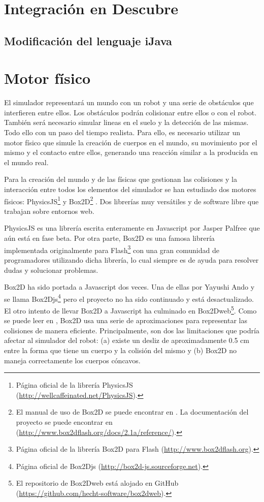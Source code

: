 \section{Integración en Descubre}
\label{sec:integracion-descubre}

\subsection{Modificación del lenguaje iJava}
\label{sec:modificacion-ijava}







\section{Motor físico}
\label{sec:motor-fisico}

El simulador representará un mundo con un robot y una serie de obstáculos que interfieren entre ellos. Los obstáculos podrán colisionar entre ellos o con el robot. También será necesario simular lineas en el suelo y la detección de las mismas. Todo ello con un paso del tiempo realista. Para ello, es necesario utilizar un motor físico que simule la creación de cuerpos en el mundo, su movimiento por el mismo y el contacto entre ellos, generando una reacción similar a la producida en el mundo real.

Para la creación del mundo y de las físicas que gestionan las colisiones y la interacción entre todos los elementos del simulador se han estudiado dos motores físicos: PhysicsJS\footnote{Página oficial de la librería PhysicsJS (\url{http://wellcaffeinated.net/PhysicsJS}).} y Box2D\footnote{El manual de uso de Box2D se puede encontrar en \cite{box2d-manual}. La documentación del proyecto se puede encontrar en (\url{http://www.box2dflash.org/docs/2.1a/reference/}).} \cite{box2d}. Dos librerías muy versátiles y de software libre que trabajan sobre entornos web.

PhysicsJS  es una librería escrita enteramente en Javascript por Jasper Palfree que aún está en fase beta. Por otra parte, Box2D es una famosa librería implementada originalmente para Flash\footnote{Página oficial de la librería Box2D para Flash (\url{http://www.box2dflash.org}).} con una gran comunidad de programadores utilizando dicha librería, lo cual siempre es de ayuda para resolver dudas y solucionar problemas. 

Box2D ha sido portada a Javascript dos veces. Una de ellas por Yayushi Ando y se llama Box2Djs\footnote{Página oficial de Box2Djs (\url{http://box2d-js.sourceforge.net}).} pero el proyecto no ha sido continuado y está desactualizado. El otro intento de llevar Box2D a Javascript ha culminado en Box2Dweb\footnote{El repositorio de Box2Dweb está alojado en GitHub (\url{https://github.com/hecht-software/box2dweb}).}. Como se puede leer en \cite[capítulo 13]{box2d-manual}, Box2D usa una serie de aproximaciones para representar las colisiones de manera eficiente. Principalmente, son dos las limitaciones que podría afectar al simulador del robot: (a) existe un desliz de aproximadamente 0.5 cm entre la forma que tiene un cuerpo y la colisión del mismo y (b) Box2D no maneja correctamente los cuerpos cóncavos. 

